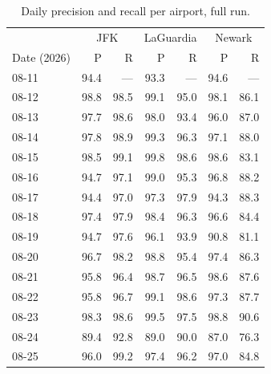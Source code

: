 \documentclass[11pt]{article}
\begin{document}
\begin{table}[H]
\centering
\small
\begin{tabular}{lrrrrrr}
\toprule
 & \multicolumn{2}{c}{JFK} & \multicolumn{2}{c}{LaGuardia} & \multicolumn{2}{c}{Newark} \\
Date (2026) & P & R & P & R & P & R \\
\midrule
08-11 & 94.4 & --- & 93.3 & --- & 94.6 & --- \\
08-12 & 98.8 & 98.5 & 99.1 & 95.0 & 98.1 & 86.1 \\
08-13 & 97.7 & 98.6 & 98.0 & 93.4 & 96.0 & 87.0 \\
08-14 & 97.8 & 98.9 & 99.3 & 96.3 & 97.1 & 88.0 \\
08-15 & 98.5 & 99.1 & 99.8 & 98.6 & 98.6 & 83.1 \\
08-16 & 94.7 & 97.1 & 99.0 & 95.3 & 96.8 & 88.2 \\
08-17 & 94.4 & 97.0 & 97.3 & 97.9 & 94.3 & 88.3 \\
08-18 & 97.4 & 97.9 & 98.4 & 96.3 & 96.6 & 84.4 \\
08-19 & 94.7 & 97.6 & 96.1 & 93.9 & 90.8 & 81.1 \\
08-20 & 96.7 & 98.2 & 98.8 & 95.4 & 97.4 & 86.3 \\
08-21 & 95.8 & 96.4 & 98.7 & 96.5 & 98.6 & 87.6 \\
08-22 & 95.8 & 96.7 & 99.1 & 98.6 & 97.3 & 87.7 \\
08-23 & 98.3 & 98.6 & 99.5 & 97.5 & 98.8 & 90.6 \\
08-24 & 89.4 & 92.8 & 89.0 & 90.0 & 87.0 & 76.3 \\
08-25 & 96.0 & 99.2 & 97.4 & 96.2 & 97.0 & 84.8 \\
\bottomrule
\end{tabular}
\caption{Daily precision and recall per airport, full run.}
\end{table}
\end{document}
